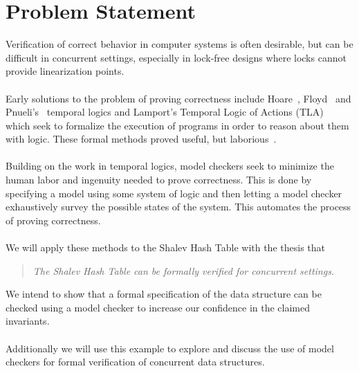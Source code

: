 \documentclass{uit-thesis}
\begin{document}
\section{Problem Statement}\label{sec:problem-statement}
Verification of correct behavior in computer systems is often desirable, but can be difficult in concurrent settings, especially in lock-free designs where locks cannot provide linearization points. 
\\\\
Early solutions to the problem of proving correctness include Hoare~\cite{Hoare1969}, Floyd~\cite{Floyd1967} and Pnueli's~\cite{Pnueli1977} temporal logics and Lamport's Temporal Logic of Actions (TLA)~\cite{Lamport1977} which seek to formalize the execution of programs in order to reason about them with logic. These formal methods proved useful, but laborious~\cite{Clarke2009}.
\\\\
Building on the work in temporal logics, model checkers seek to minimize the human labor and ingenuity needed to prove correctness. This is done by specifying a model using some system of logic and then letting a model checker exhaustively survey the possible states of the system. This automates the process of proving correctness.
\\\\
We will apply these methods to the Shalev Hash Table with the thesis that
\begin{quote}
    \emph{The Shalev Hash Table can be formally verified for concurrent settings.}
\end{quote}
We intend to show that a formal specification of the data structure can be checked using a model checker to increase our confidence in the claimed invariants.
\\\\
Additionally we will use this example to explore and discuss the use of model checkers for formal verification of concurrent data structures.
\end{document}
